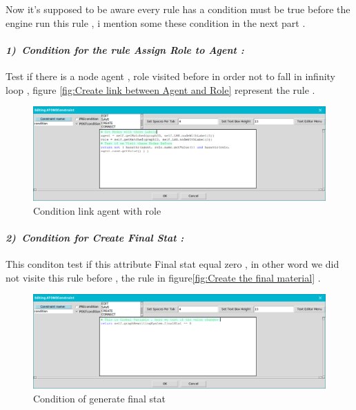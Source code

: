 Now it's supposed to be aware every rule has a condition must be true  before the engine run this rule , i mention some these condition in the next part . \paragraph{\emph{1)~Condition for the rule   Assign Role to Agent  :  } } 
 
Test if there is a node agent , role visited before 
in order not to fall in infinity loop , figure \ref{fig:Create link between Agent and Role} represent the rule .
 
\begin{figure}[th]
	\centering
 	\includegraphics[scale=0.37]{Chapiter3/img/condrule1}
	\caption{\label{fig:Condition link agent with role}Condition link agent with role  }
\end{figure} 
\pagebreak 
\paragraph{\emph{2)~Condition for Create Final Stat : } } 
This conditon test if this attribute Final stat equal zero 
, in other word we did not visite this rule before , the rule in figure\ref{fig:Create the final material} .
 
 
\vspace{1cm}
\begin{figure}[th]
	\centering
 	\includegraphics[scale=0.37]{Chapiter3/img/condfinal}
	\caption{\label{fig:Condition of generate final stat } Condition of generate final stat }
\end{figure} 
 

